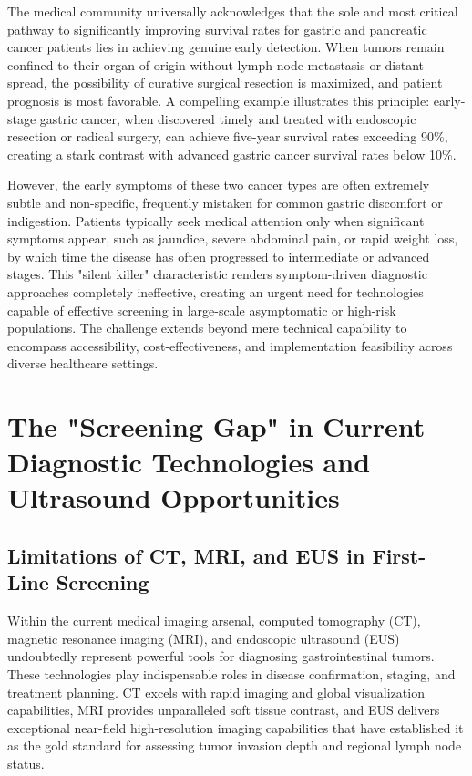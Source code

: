 The medical community universally acknowledges that the sole and most critical pathway to significantly improving survival rates for gastric and pancreatic cancer patients lies in achieving genuine early detection. When tumors remain confined to their organ of origin without lymph node metastasis or distant spread, the possibility of curative surgical resection is maximized, and patient prognosis is most favorable. A compelling example illustrates this principle: early-stage gastric cancer, when discovered timely and treated with endoscopic resection or radical surgery, can achieve five-year survival rates exceeding 90\%, creating a stark contrast with advanced gastric cancer survival rates below 10\%.

However, the early symptoms of these two cancer types are often extremely subtle and non-specific, frequently mistaken for common gastric discomfort or indigestion. Patients typically seek medical attention only when significant symptoms appear, such as jaundice, severe abdominal pain, or rapid weight loss, by which time the disease has often progressed to intermediate or advanced stages. This "silent killer" characteristic renders symptom-driven diagnostic approaches completely ineffective, creating an urgent need for technologies capable of effective screening in large-scale asymptomatic or high-risk populations. The challenge extends beyond mere technical capability to encompass accessibility, cost-effectiveness, and implementation feasibility across diverse healthcare settings.

\section{The "Screening Gap" in Current Diagnostic Technologies and Ultrasound Opportunities}

\subsection{Limitations of CT, MRI, and EUS in First-Line Screening}

Within the current medical imaging arsenal, computed tomography (CT), magnetic resonance imaging (MRI), and endoscopic ultrasound (EUS) undoubtedly represent powerful tools for diagnosing gastrointestinal tumors. These technologies play indispensable roles in disease confirmation, staging, and treatment planning. CT excels with rapid imaging and global visualization capabilities, MRI provides unparalleled soft tissue contrast, and EUS delivers exceptional near-field high-resolution imaging capabilities that have established it as the gold standard for assessing tumor invasion depth and regional lymph node status.

